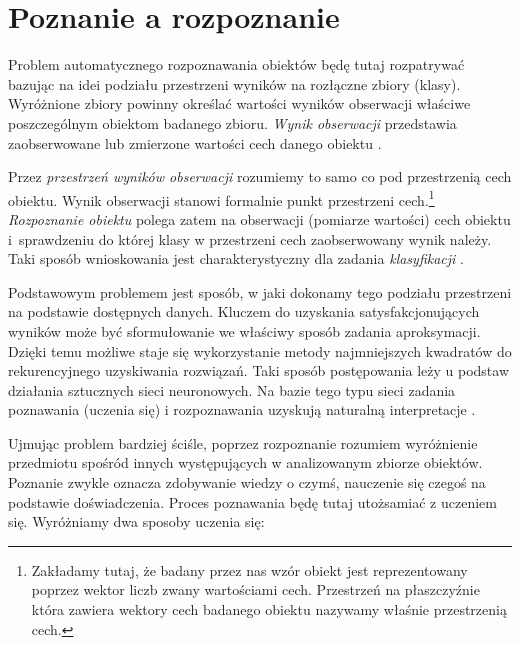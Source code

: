
\clearpage
\section{Poznanie a rozpoznanie}
Problem automatycznego rozpoznawania obiektów będę tutaj rozpatrywać bazując na idei podziału przestrzeni wyników na rozłączne zbiory (klasy). Wyróżnione zbiory powinny określać wartości wyników obserwacji właściwe poszczególnym obiektom badanego zbioru. \textit{Wynik obserwacji} przedstawia zaobserwowane lub zmierzone wartości cech danego obiektu \citep[s. 7]{Kwiatkowski2007}.

Przez \textit{przestrzeń wyników obserwacji} rozumiemy to samo co pod przestrzenią cech obiektu. Wynik obserwacji stanowi formalnie punkt przestrzeni cech.\footnote{Zakładamy tutaj, że badany przez nas wzór obiekt jest reprezentowany poprzez wektor liczb zwany wartościami cech. Przestrzeń na płaszczyźnie która zawiera wektory cech badanego obiektu nazywamy właśnie przestrzenią cech.} \textit{Rozpoznanie obiektu} polega zatem na obserwacji (pomiarze wartości) cech obiektu i~sprawdzeniu do której klasy w przestrzeni cech zaobserwowany wynik należy. Taki sposób wnioskowania jest charakterystyczny dla zadania \textit{klasyfikacji} \citep[s. 7]{Kwiatkowski2007}.

Podstawowym problemem jest sposób, w jaki dokonamy tego podziału przestrzeni na podstawie dostępnych danych. Kluczem do uzyskania satysfakcjonujących wyników może być sformułowanie we właściwy sposób zadania aproksymacji. Dzięki temu możliwe staje się wykorzystanie metody najmniejszych kwadratów do rekurencyjnego uzyskiwania rozwiązań. Taki sposób postępowania leży u podstaw działania sztucznych sieci neuronowych. Na bazie tego typu sieci zadania poznawania (uczenia się) i rozpoznawania uzyskują naturalną interpretacje \citep[s. 7-8]{Kwiatkowski2007}.

Ujmując problem bardziej ściśle, poprzez rozpoznanie rozumiem wyróżnienie przedmiotu spośród innych występujących w analizowanym zbiorze obiektów. Poznanie zwykle oznacza zdobywanie wiedzy o czymś, nauczenie się czegoś na podstawie doświadczenia. Proces poznawania będę tutaj utożsamiać z uczeniem się.
Wyróżniamy dwa sposoby uczenia się:


